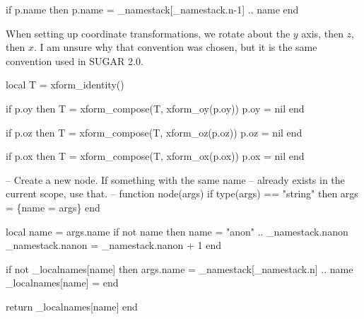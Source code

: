 if p.name then
  p.name = _namestack[_namestack.n-1] .. name
end
\nwendcode{}\nwdocspar

When setting up coordinate transformations,
we rotate about the $y$ axis, then $z$, then $x$.  I am unsure why
that convention was chosen, but it is the same convention used in
SUGAR 2.0.

\nwenddocs{}\endmoddef\nwstartdeflinemarkup{}\nwenddeflinemarkup
local T = xform_identity()

if p.oy then
  T = xform_compose(T, xform_oy(p.oy))
  p.oy = nil
end

if p.oz then
  T = xform_compose(T, xform_oz(p.oz))
  p.oz = nil
end

if p.ox then
  T = xform_compose(T, xform_ox(p.ox))
  p.ox = nil
end

\nwendcode{}\nwdocspar

\nwenddocs{}\plusendmoddef\nwstartdeflinemarkup{}\nwenddeflinemarkup
-- Create a new node.  If something with the same name
-- already exists in the current scope, use that.
--
function node(args)
  if type(args) == "string" then
    args = \{name = args\}
  end

  local name = args.name
  if not name then
    name = "anon" .. _namestack.nanon
    _namestack.nanon = _namestack.nanon + 1
  end

  if not _localnames[name] then 
    args.name = _namestack[_namestack.n] .. name
    _localnames[name] = %
  end

  return _localnames[name]
end

\nwendcode{}

%
%
%
%
%
\nwdocspar

\nwenddocs{}
